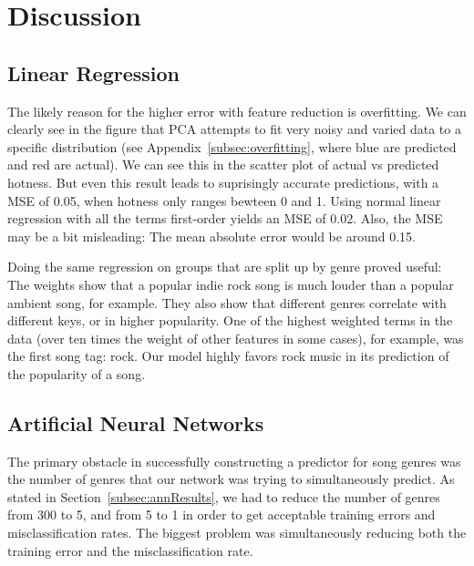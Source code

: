 \documentclass[12pt]{article}
\begin{document}


\section{Discussion}
\label{sec:discussion}

\subsection{Linear Regression}
\label{subsec:linearRegressionDisc}
The likely reason for the higher error with feature reduction is overfitting. We can clearly see in the figure that PCA attempts to fit very noisy and varied data to a specific distribution (see Appendix~\ref{subsec:overfitting}, where blue are predicted and red are actual). We can see this in the scatter plot of actual vs predicted hotness. But even this result leads to suprisingly accurate predictions, with a MSE of 0.05, when hotness only ranges bewteen 0 and 1. Using normal linear regression with all the terms first-order yields an MSE of 0.02.  Also, the MSE may be a bit misleading: The mean absolute error would be around 0.15. 

Doing the same regression on groups that are split up by genre proved useful: The weights show that a popular indie rock song is much louder than a popular ambient song, for example. They also show that different genres correlate with different keys, or in higher popularity. One of the highest weighted terms in the data (over ten times the weight of other features in some cases), for example, was the first song tag: rock. Our model highly favors rock music in its prediction of the popularity of a song.
\subsection{Artificial Neural Networks}
\label{subsec:annDisc}
The primary obstacle in successfully constructing a predictor for song genres was the number of genres that our network was trying to simultaneously predict. As stated in Section~\ref{subsec:annResults}, we had to reduce the number of genres from 300 to 5, and from 5 to 1 in order to get acceptable training errors and misclassification rates. The biggest problem was simultaneously reducing both the training error and the misclassification rate. 
\end{document}
